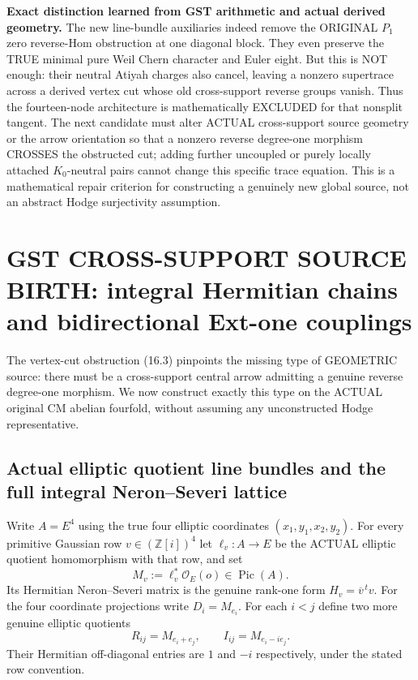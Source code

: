 \documentclass[11pt,a4paper]{article}
\begin{document}
\noindent\textbf{Exact distinction learned from GST arithmetic and actual derived geometry.}
The new
line-bundle
auxiliaries
indeed remove
the ORIGINAL
\(P_1\) zero
reverse-Hom
obstruction
at one
diagonal block.
They even
preserve the
TRUE minimal
pure Weil
Chern character
and Euler eight.
But this
is NOT enough:
their neutral
Atiyah charges
also cancel,
leaving a
nonzero
supertrace
across a
derived vertex cut
whose old
cross-support
reverse groups
vanish.
Thus the
fourteen-node
architecture
is mathematically
EXCLUDED for
that nonsplit
tangent.
The next
candidate must
alter ACTUAL
cross-support
source geometry
or the arrow
orientation
so that a
nonzero reverse
degree-one
morphism
CROSSES the
obstructed cut;
adding further
uncoupled or
purely locally
attached
\(K_0\)-neutral
pairs cannot
change this
specific
trace equation.
This is a
mathematical
repair criterion
for constructing
a genuinely
new global
source, not
an abstract
Hodge
surjectivity
assumption.

\section{GST CROSS-SUPPORT SOURCE BIRTH: integral Hermitian chains and bidirectional Ext-one couplings}
The vertex-cut
obstruction
(16.3)
pinpoints the
missing type
of GEOMETRIC
source:
there must
be a
cross-support
central arrow
admitting a
genuine
reverse
degree-one
morphism.
We now
construct
exactly this
type on the
ACTUAL original
CM abelian
fourfold,
without
assuming any
unconstructed
Hodge
representative.

\subsection*{Actual elliptic quotient line bundles and the full integral Neron--Severi lattice}
Write \(A=E^4\)
using the
true four
elliptic
coordinates
\((x_1,y_1,x_2,y_2)\).
For every
primitive
Gaussian
row \(v\in
(\mathbb Z[i])^4\)
let
\(\ell_v:A\to E\)
be the ACTUAL
elliptic
quotient
homomorphism
with that row,
and set
\[
 \boxed{
 M_v:=\ell_v^*\mathcal O_E(o)
                 \in\operatorname{Pic}(A).
 }                                                       \tag{17.1}
\]
Its Hermitian
Neron--Severi
matrix is the
genuine
rank-one
form
\(H_v=\overline v^{\,t}v\).
For the four
coordinate
projections
write \(D_i=M_{e_i}\).
For each
\(i<j\)
define two
more genuine
elliptic
quotients
\[
 R_{ij}=M_{e_i+e_j},
 \qquad
 I_{ij}=M_{e_i-i e_j}.
\]
Their
Hermitian
off-diagonal
entries are
\(1\) and
\(-i\)
respectively,
under the
stated row
convention.
\end{document}
